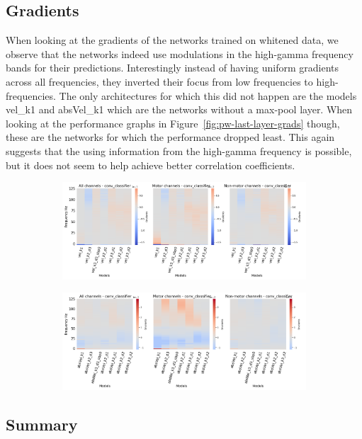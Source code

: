\subsection{Gradients}\label{subsec:pw-gradients2}

When looking at the gradients of the networks trained on whitened data, we observe that the networks indeed use modulations in the high-gamma frequency bands for their predictions.
Interestingly instead of having uniform gradients across all frequencies, they inverted their focus from low frequencies to high-frequencies.
The only architectures for which this did not happen are the models vel\_k1 and absVel\_k1 which are the networks without a max-pool layer.
When looking at the performance graphs in Figure~\ref{fig:pw-last-layer-grads} though, these are the networks for which the performance dropped least.
This again suggests that the using information from the high-gamma frequency is possible, but it does not seem to help achieve better correlation coefficients.

\begin{figure}[!hpbp]
\begin{subfigure}[a]{\textwidth}
   \includegraphics[width=1\linewidth]{img/ch4/vel-pw-last-layer-grads}
   \caption{}
\end{subfigure}\label{fig:vel-pw-last-layer-grads}

\begin{subfigure}[b]{\textwidth}
   \includegraphics[width=1\linewidth]{img/ch4/absVel-pw-last-layer-grads}
   \caption{}
\end{subfigure}\label{fig:absVel-pw-last-layet-grads}
\caption[]{}
\end{figure}\label{fig:pw-last-layer-grads}

\subsection{Summary}\label{subsec:pw-summary}